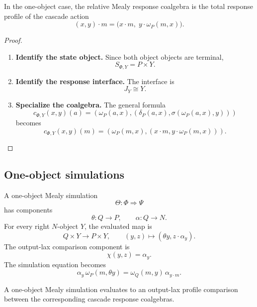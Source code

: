 \begin{proposition}
\label{prop:poly-relative-one-object-cascade-response}
In the one-object case, the relative Mealy response coalgebra is the total
response profile of the cascade action
\[
(x,y)\cdot m
=
\bigl(x\cdot m,\;y\cdot\omega_P(m,x)\bigr).
\]
\end{proposition}

\begin{proof}
\leavevmode
\begin{enumerate}
\item \textbf{Identify the state object.}
Since both object objects are terminal,
\[
S_{\Phi,Y}=P\times Y.
\]

\item \textbf{Identify the response interface.}
The interface is
\[
J_Y\cong Y.
\]

\item \textbf{Specialize the coalgebra.}
The general formula
\[
c_{\Phi,Y}(x,y)(a)
=
\left(
\omega_P(a,x),
\left(
\delta_P(a,x),
\sigma(\omega_P(a,x),y)
\right)
\right)
\]
becomes
\[
c_{\Phi,Y}(x,y)(m)
=
\left(
\omega_P(m,x),
\left(
x\cdot m,
y\cdot\omega_P(m,x)
\right)
\right).
\]
\end{enumerate}
\end{proof}

\subsection{One-object simulations}
\label{subsec:poly-relative-one-object-simulations}

A one-object Mealy simulation
\[
\Theta:\Phi\Rightarrow\Psi
\]
has components
\[
\theta:Q\to P,
\qquad
\alpha:Q\to N.
\]
For every right \(N\)-object \(Y\), the evaluated map is
\[
Q\times Y\to P\times Y,
\qquad
(y,z)\longmapsto(\theta y,z\cdot\alpha_y).
\]
The output-lax comparison component is
\[
\chi(y,z)=\alpha_y.
\]
The simulation equation becomes
\[
\alpha_y\,\omega_P(m,\theta y)
=
\omega_Q(m,y)\,\alpha_{y\cdot m}.
\]

\begin{proposition}
\label{prop:poly-relative-one-object-output-lax}
A one-object Mealy simulation evaluates to an output-lax profile comparison
between the corresponding cascade response coalgebras.
\end{proposition}

